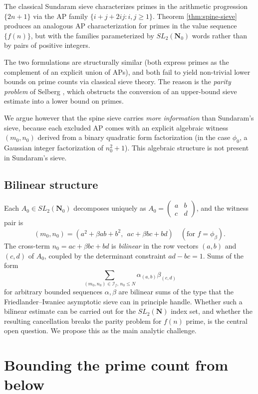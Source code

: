\documentclass[11pt]{article}
\theoremstyle{definition}
\newcommand{\N}{\mathbf{N}}
\newcommand{\Nz}{\mathbf{N}_0}
\newcommand{\SLNz}{SL_2(\Nz)}
\newcommand{\SLN}{SL_2(\N)}
\begin{document}
The classical Sundaram sieve \cite{sundaram} characterizes primes in the arithmetic progression $\{2n+1\}$ via the AP family $\{i+j+2ij : i,j \ge 1\}$. Theorem \ref{thm:spine-sieve} produces an analogous AP characterization for primes in the value sequence $\{f(n)\}$, but with the families parameterized by $\SLNz$ words rather than by pairs of positive integers.

The two formulations are structurally similar (both express primes as the complement of an explicit union of APs), and both fail to yield non-trivial lower bounds on prime counts via classical sieve theory. The reason is the \emph{parity problem} of Selberg \cite{selberg}, which obstructs the conversion of an upper-bound sieve estimate into a lower bound on primes.

We argue however that the spine sieve carries \emph{more information} than Sundaram's sieve, because each excluded AP comes with an explicit algebraic witness $(m_0,n_0)$ derived from a binary quadratic form factorization (in the case $\phi_0$, a Gaussian integer factorization of $n_0^2+1$). This algebraic structure is not present in Sundaram's sieve.

\subsection{Bilinear structure}

Each $A_0 \in \SLNz$ decomposes uniquely as $A_0 = \begin{pmatrix}a & b \\ c & d\end{pmatrix}$, and the witness pair is
\[
(m_0,n_0) = (a^2 + \beta ab + b^2, \;\, ac + \beta bc + bd) \quad (\text{for } f = \phi_\beta).
\]
The cross-term $n_0 = ac+\beta bc + bd$ is \emph{bilinear} in the row vectors $(a,b)$ and $(c,d)$ of $A_0$, coupled by the determinant constraint $ad-bc=1$. Sums of the form
\[
\sum_{(m_0,n_0) \in \mathcal{I}_f, \, n_0 \le N} \alpha_{(a,b)} \beta_{(c,d)}
\]
for arbitrary bounded sequences $\alpha,\beta$ are bilinear sums of the type that the Friedlander–Iwaniec asymptotic sieve \cite{FI} can in principle handle. Whether such a bilinear estimate can be carried out for the $\SLN$ index set, and whether the resulting cancellation breaks the parity problem for $f(n)$ prime, is the central open question. We propose this as the main analytic challenge.

\section{Bounding the prime count from below}\label{sec:bounds}
\end{document}

